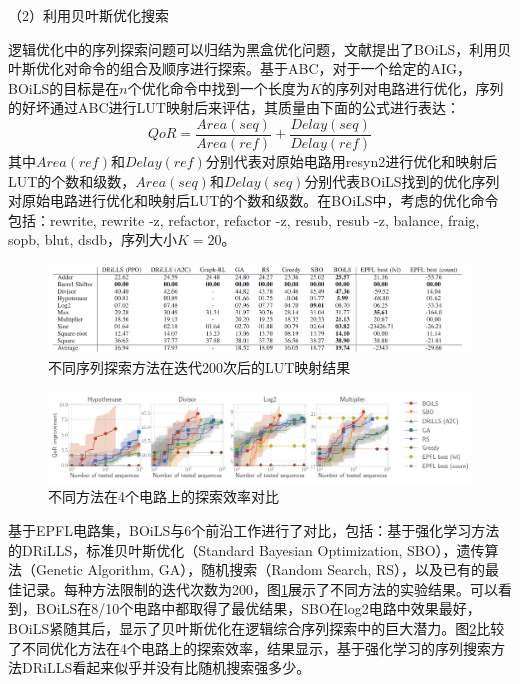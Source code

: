 （2）利用贝叶斯优化搜索

逻辑优化中的序列探索问题可以归结为黑盒优化问题，文献\cite{LS:BOiLS}提出了BOiLS，利用贝叶斯优化对命令的组合及顺序进行探索。基于ABC，对于一个给定的AIG，BOiLS的目标是在$n$个优化命令中找到一个长度为$K$的序列对电路进行优化，序列的好坏通过ABC进行LUT映射后来评估，其质量由下面的公式进行表达：
\begin{equation}
    \label{LS:BOiLS:Eq:QoR}
    QoR = \frac{Area(seq)}{Area(ref)} + \frac{Delay(seq)}{Delay(ref)}
\end{equation}
其中$Area(ref)$和$Delay(ref)$分别代表对原始电路用resyn2进行优化和映射后LUT的个数和级数，$Area(seq)$和$Delay(seq)$分别代表BOiLS找到的优化序列对原始电路进行优化和映射后LUT的个数和级数。在BOiLS中，考虑的优化命令包括：rewrite, rewrite -z, refactor, refactor -z, resub, resub -z, balance, fraig, sopb, blut, dsdb，序列大小$K=20$。

\begin{figure}[!htbp]
    \centering
    \includegraphics[width=\linewidth]{./figs/LS-BOiLS-results.png}
    \caption{不同序列探索方法在迭代200次后的LUT映射结果}
    \label{LS:BOiLS:Fig:results}
\end{figure}

\begin{figure}[!htbp]
    \centering
    \includegraphics[width=\linewidth]{./figs/LS-BOiLS-results_2.png}
    \caption{不同方法在4个电路上的探索效率对比}
    \label{LS:BOiLS:Fig:results_2}
\end{figure}

基于EPFL电路集\cite{LS:EPFL_benchs_iwls,LS:EPFL_benchs_github}，BOiLS与6个前沿工作进行了对比，包括：基于强化学习方法的DRiLLS\cite{LS:DRiLLS}，标准贝叶斯优化（Standard Bayesian Optimization, SBO），遗传算法（Genetic Algorithm, GA），随机搜索（Random Search, RS），以及已有的最佳记录。每种方法限制的迭代次数为200，图\ref{LS:BOiLS:Fig:results}展示了不同方法的实验结果。可以看到，BOiLS在8/10个电路中都取得了最优结果，SBO在log2电路中效果最好，BOiLS紧随其后，显示了贝叶斯优化在逻辑综合序列探索中的巨大潜力。图\ref{LS:BOiLS:Fig:results_2}比较了不同优化方法在4个电路上的探索效率，结果显示，基于强化学习的序列搜索方法DRiLLS看起来似乎并没有比随机搜索强多少。

